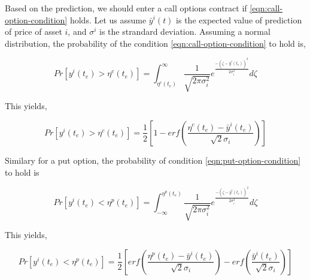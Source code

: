 \documentclass{article}
\begin{document}
Based on the prediction, we should enter a call options contract if
\ref{eqn:call-option-condition} holds. Let us assume $\bar{y}^{i}(t)$
is the expected value of prediction of price of asset $i$, and
$\sigma^{i}$ is the strandard deviation. Assuming a normal
distribution, the probability of the condition
\ref{eqn:call-option-condition} to hold is,

\begin{equation}\label{eqn:call-option-prob-intg}
Pr[ y^{i}(t_{e}) > \eta^{c}(t_{e}) ] = \int_{\eta^{c}(t_{e})}^{\infty}
\frac{1}{\sqrt{2\pi\sigma_{i}^{2}}}
e^{\frac{-(\zeta-\bar{y}^{i}(t_{e}))^{2}}{2\sigma_{i}^{2}}} d\zeta
\end{equation}

This yields,

\begin{equation}\label{eqn:call-option-prob}
Pr[ y^{i}(t_{e}) > \eta^{c}(t_{e}) ] = \frac{1}{2} [ 1 - erf(
  \frac{\eta^{c}(t_{e})-\bar{y}^{i}(t_{e})}{\sqrt{2} \sigma_{i}} ) ]
\end{equation}

Similary for a put option, the probability of
condition \ref{eqn:put-option-condition} to hold is

\begin{equation}\label{eqn:put-option-prob-intg}
Pr[ y^{i}(t_{e}) < \eta^{p}(t_{e}) ] =
\int_{-\infty}^{\eta^{p}(t_{e})} \frac{1}{\sqrt{2\pi\sigma_{i}^{2}}}
e^{\frac{-(\zeta-\bar{y}^{i}(t_{e}))^{2}}{2\sigma_{i}^{2}}} d\zeta
\end{equation}

This yields,

\begin{equation}\label{eqn:call-option-prob}
Pr[ y^{i}(t_{e}) < \eta^{p}(t_{e}) ] = \frac{1}{2} [ erf(
  \frac{\eta^{p}(t_{e})-\bar{y}^{i}(t_{e})}{\sqrt{2} \sigma_{i}} ) -
  erf( \frac{\bar{y}^{i}(t_{e})}{\sqrt{2} \sigma_{i}} ) ]
\end{equation}
\end{document}
